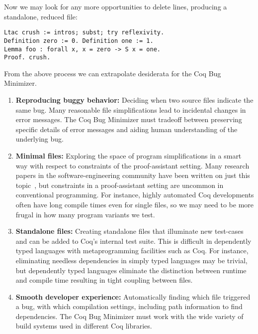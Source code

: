 \documentclass[a4paper,USenglish,cleveref,autoref,thm-restate]{lipics-v2021}
\begin{document}
Now we may look for any more opportunities to delete lines, producing a standalone, reduced file:
\begin{verbatim}
Ltac crush := intros; subst; try reflexivity.
Definition zero := 0. Definition one := 1.
Lemma foo : forall x, x = zero -> S x = one.
Proof. crush.
\end{verbatim}

From the above process we can extrapolate desiderata for the Coq Bug Minimizer.

\begin{enumerate}
\item \textbf{Reproducing buggy behavior:} Deciding when two source files indicate the same bug.
Many reasonable file simplifications lead to incidental changes in error messages.
The Coq Bug Minimizer must tradeoff between preserving specific details of error messages and aiding human understanding of the underlying bug.

\item \textbf{Minimal files:} Exploring the space of program simplifications in a smart way with respect to constraints of the proof-assistant setting.
Many research papers in the software-engineering community have been written on just this topic~\cite{Cleve2000,zeller2009programs,Burger2005,delta,Zeller2002}, but constraints in a proof-assistant setting are uncommon in conventional programming.
For instance, highly automated Coq developments often have long compile times even for single files, so we may need to be more frugal in how many program variants we test.

\item \textbf{Standalone files:} Creating standalone files that illuminate new test-cases and can be added to Coq's internal test suite.
This is difficult in dependently typed languages with metaprogramming facilities such as Coq.
For instance, eliminating needless dependencies in simply typed languages may be trivial, but dependently typed languages eliminate the distinction between runtime and compile time resulting in tight coupling between files.

\item \textbf{Smooth developer experience:} Automatically finding which file triggered a bug, with which compilation settings, including path information to find dependencies.
The Coq Bug Minimizer must work with the wide variety of build systems used in different Coq libraries.


\end{enumerate}
\end{document}
